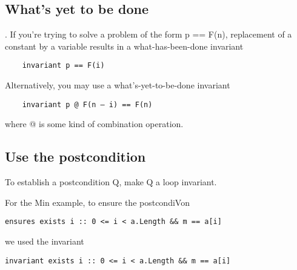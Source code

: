\subsection{What's yet to be done}.
If you're trying to solve a problem of the form
p == F(n), replacement of a constant by a variable
results in a what-has-been-done invariant
\begin{verbatim}
    invariant p == F(i)
\end{verbatim}
Alternatively, you may use a what's-yet-to-be-done
invariant

\begin{verbatim}
    invariant p @ F(n – i) == F(n)
\end{verbatim}
where @ is some kind of combination operation.

\subsection{Use the postcondition}
To establish a postcondition Q, make Q a loop
invariant.

For the Min example, to ensure the postcondiVon
\begin{verbatim}
ensures exists i :: 0 <= i < a.Length && m == a[i]
\end{verbatim}
we used the invariant
\begin{verbatim}
invariant exists i :: 0 <= i < a.Length && m == a[i]
\end{verbatim}